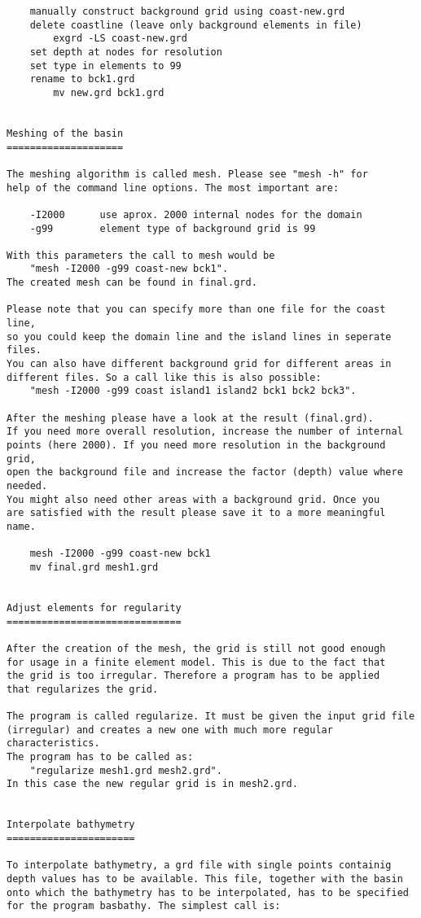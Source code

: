 \begin{verbatim}
	manually construct background grid using coast-new.grd
	delete coastline (leave only background elements in file)
		exgrd -LS coast-new.grd
	set depth at nodes for resolution
	set type in elements to 99
	rename to bck1.grd
		mv new.grd bck1.grd


Meshing of the basin
====================

The meshing algorithm is called mesh. Please see "mesh -h" for
help of the command line options. The most important are:

	-I2000		use aprox. 2000 internal nodes for the domain
	-g99		element type of background grid is 99

With this parameters the call to mesh would be
	"mesh -I2000 -g99 coast-new bck1".
The created mesh can be found in final.grd.

Please note that you can specify more than one file for the coast line,
so you could keep the domain line and the island lines in seperate files.
You can also have different background grid for different areas in
different files. So a call like this is also possible:
	"mesh -I2000 -g99 coast island1 island2 bck1 bck2 bck3".

After the meshing please have a look at the result (final.grd).
If you need more overall resolution, increase the number of internal
points (here 2000). If you need more resolution in the background grid,
open the background file and increase the factor (depth) value where needed.
You might also need other areas with a background grid. Once you
are satisfied with the result please save it to a more meaningful name.

	mesh -I2000 -g99 coast-new bck1
	mv final.grd mesh1.grd


Adjust elements for regularity
==============================

After the creation of the mesh, the grid is still not good enough
for usage in a finite element model. This is due to the fact that
the grid is too irregular. Therefore a program has to be applied
that regularizes the grid. 

The program is called regularize. It must be given the input grid file
(irregular) and creates a new one with much more regular characteristics.
The program has to be called as:
	"regularize mesh1.grd mesh2.grd".
In this case the new regular grid is in mesh2.grd.


Interpolate bathymetry
======================

To interpolate bathymetry, a grd file with single points containig
depth values has to be available. This file, together with the basin
onto which the bathymetry has to be interpolated, has to be specified
for the program basbathy. The simplest call is:


\end{verbatim}

